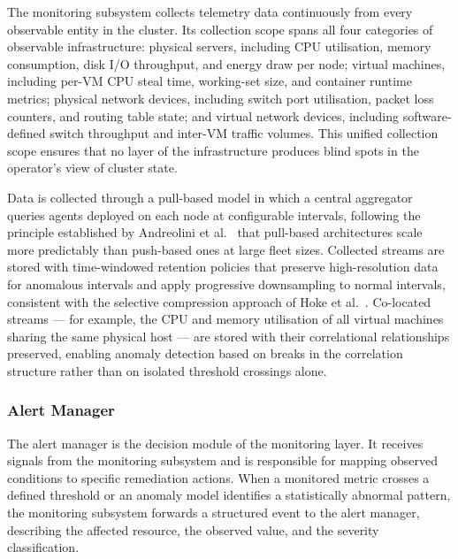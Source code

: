 \documentclass[a4paper, 12pt]{report}
\begin{document}
The monitoring subsystem collects telemetry data continuously from every
observable entity in the cluster.  Its collection scope spans all four
categories of observable infrastructure: physical servers, including
CPU utilisation, memory consumption, disk I/O throughput, and energy
draw per node; virtual machines, including per-VM CPU steal time,
working-set size, and container runtime metrics; physical network devices,
including switch port utilisation, packet loss counters, and routing
table state; and virtual network devices, including software-defined
switch throughput and inter-VM traffic volumes.  This unified collection
scope ensures that no layer of the infrastructure produces blind spots
in the operator's view of cluster state.
 
Data is collected through a pull-based model in which a central
aggregator queries agents deployed on each node at configurable
intervals, following the principle established by Andreolini et al.\
\cite{andreolini2014closer} that pull-based architectures scale more
predictably than push-based ones at large fleet sizes.  Collected streams
are stored with time-windowed retention policies that preserve
high-resolution data for anomalous intervals and apply progressive
downsampling to normal intervals, consistent with the selective
compression approach of Hoke et al.\ \cite{hoke2006intemon}.
Co-located streams --- for example, the CPU and memory utilisation of
all virtual machines sharing the same physical host --- are stored with
their correlational relationships preserved, enabling anomaly detection
based on breaks in the correlation structure rather than on isolated
threshold crossings alone.
 
\subsubsection{Alert Manager}
 
The alert manager is the decision module of the monitoring layer.  It
receives signals from the monitoring subsystem and is responsible for
mapping observed conditions to specific remediation actions.  When a
monitored metric crosses a defined threshold or an anomaly model
identifies a statistically abnormal pattern, the monitoring subsystem
forwards a structured event to the alert manager, describing the affected
resource, the observed value, and the severity classification.
 
\end{document}
